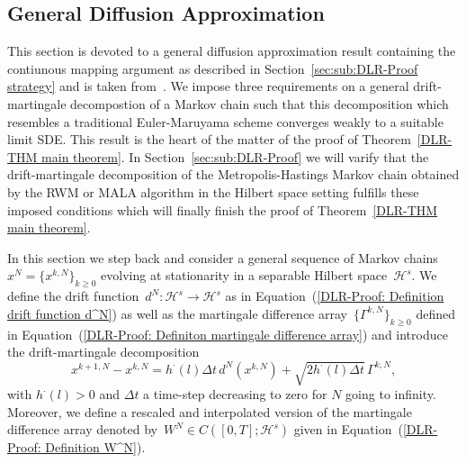 \subsection{General Diffusion Approximation}
\label{sec:sub:DLR-General diffusion approximation}

This section is devoted to a general diffusion approximation result containing the contiunous mapping argument as described in Section~\ref{sec:sub:DLR-Proof strategy} and is taken from~\autocite[Section 3.2]{Pillai2012}. We impose three requirements on a general drift-martingale decompostion of a Markov chain such that this decomposition which resembles a traditional Euler-Maruyama scheme converges weakly to a suitable limit SDE. This result is the heart of the matter of the proof of Theorem~\ref{DLR-THM main theorem}. In Section~\ref{sec:sub:DLR-Proof} we will varify that the drift-martingale decomposition of the Metropolis-Hastings Markov chain obtained by the RWM or MALA algorithm in the Hilbert space setting fulfills these imposed conditions which  will finally finish the proof of Theorem~\ref{DLR-THM main theorem}.

In this section we step back and consider a general sequence of Markov chains~$x^N = \{ x^{k,N} \}_{k\geq0}$ evolving at stationarity in a separable Hilbert space~$\mathcal{H}^s$. We define the drift function~$d^N: \mathcal{H}^s \to \mathcal{H}^s$ as in Equation~(\ref{DLR-Proof: Definition drift function d^N}) as well as the martingale difference array~$\{\Gamma^{k,N}\}_{k\geq0}$ defined in Equation~(\ref{DLR-Proof: Definiton martingale difference array}) and introduce the drift-martingale decomposition
\begin{equation}
  \label{DLR-Proof: drift-martingale decomposition for general diffusion approximation}
 x^{k+1,N} - x^{k,N} = h^{\cdot}(l) \Delta t \, d^N(x^{k,N}) + \sqrt{2 h^{\cdot}(l) \Delta t} \, \Gamma^{k,N},
\end{equation}
with $h^{\cdot}(l)>0$ and $\Delta t$ a time-step decreasing to zero for $N$ going to infinity. Moreover, we define a rescaled and interpolated version of the martingale difference array denoted by~$W^N \in C([0,T];\mathcal{H}^s)$ given in Equation~(\ref{DLR-Proof: Definition W^N}).


